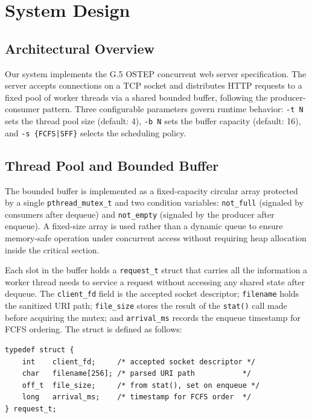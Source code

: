 \documentclass[conference]{IEEEtran}
\begin{document}
\section{System Design}
\label{sec:design}

\subsection{Architectural Overview}

Our system implements the G.5 OSTEP concurrent web server specification. The
server accepts connections on a TCP socket and distributes HTTP requests to a
fixed pool of worker threads via a shared bounded buffer, following the
producer-consumer pattern. Three configurable parameters govern runtime
behavior: \texttt{-t~N} sets the thread pool size (default: 4), \texttt{-b~N}
sets the buffer capacity (default: 16), and \texttt{-s~\{FCFS|SFF\}} selects
the scheduling policy.

\subsection{Thread Pool and Bounded Buffer}

The bounded buffer is implemented as a fixed-capacity circular array protected
by a single \texttt{pthread\_mutex\_t} and two condition variables:
\texttt{not\_full} (signaled by consumers after dequeue) and \texttt{not\_empty}
(signaled by the producer after enqueue). A fixed-size array is used rather
than a dynamic queue to ensure memory-safe operation under concurrent access
without requiring heap allocation inside the critical section.

Each slot in the buffer holds a \texttt{request\_t} struct that carries all
the information a worker thread needs to service a request without accessing
any shared state after dequeue. The \texttt{client\_fd} field is the accepted
socket descriptor; \texttt{filename} holds the sanitized URI path;
\texttt{file\_size} stores the result of the \texttt{stat()} call made before
acquiring the mutex; and \texttt{arrival\_ms} records the enqueue timestamp
for FCFS ordering. The struct is defined as follows:

\begin{lstlisting}
typedef struct {
    int    client_fd;     /* accepted socket descriptor */
    char   filename[256]; /* parsed URI path           */
    off_t  file_size;     /* from stat(), set on enqueue */
    long   arrival_ms;    /* timestamp for FCFS order  */
} request_t;
\end{lstlisting}
\end{document}
